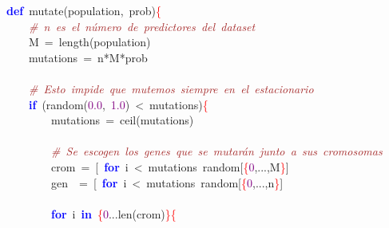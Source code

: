 \noindent
\mbox{}\textbf{\textcolor{Blue}{def}}\ mutate\textcolor{BrickRed}{(}population\textcolor{BrickRed}{,}\ prob\textcolor{BrickRed}{)}\textcolor{Red}{\{} \\
\mbox{}\ \ \ \ \textit{\textcolor{Brown}{\#\ n\ es\ el\ número\ de\ predictores\ del\ dataset}} \\
\mbox{}\ \ \ \ M\ \textcolor{BrickRed}{=}\ length\textcolor{BrickRed}{(}population\textcolor{BrickRed}{)} \\
\mbox{}\ \ \ \ mutations\ \textcolor{BrickRed}{=}\ n\textcolor{BrickRed}{*}M\textcolor{BrickRed}{*}prob \\
\mbox{} \\
\mbox{}\ \ \ \ \textit{\textcolor{Brown}{\#\ Esto\ impide\ que\ mutemos\ siempre\ en\ el\ estacionario}} \\
\mbox{}\ \ \ \ \textbf{\textcolor{Blue}{if}}\ \textcolor{BrickRed}{(}random\textcolor{BrickRed}{(}\textcolor{Purple}{0.0}\textcolor{BrickRed}{,}\ \textcolor{Purple}{1.0}\textcolor{BrickRed}{)}\ \textcolor{BrickRed}{\textless{}}\ mutations\textcolor{BrickRed}{)}\textcolor{Red}{\{} \\
\mbox{}\ \ \ \ \ \ \ \ mutations\ \textcolor{BrickRed}{=}\ ceil\textcolor{BrickRed}{(}mutations\textcolor{BrickRed}{)} \\
\mbox{} \\
\mbox{}\ \ \ \ \ \ \ \ \textit{\textcolor{Brown}{\#\ Se\ escogen\ los\ genes\ que\ se\ mutarán\ junto\ a\ sus\ cromosomas}} \\
\mbox{}\ \ \ \ \ \ \ \ crom\ \textcolor{BrickRed}{=}\ \textcolor{BrickRed}{[}\ \textbf{\textcolor{Blue}{for}}\ i\ \textcolor{BrickRed}{\textless{}}\ mutations\ random\textcolor{BrickRed}{[}\textcolor{Red}{\{}\textcolor{Purple}{0}\textcolor{BrickRed}{,...,}M\textcolor{Red}{\}}\textcolor{BrickRed}{]} \\
\mbox{}\ \ \ \ \ \ \ \ gen\ \ \textcolor{BrickRed}{=}\ \textcolor{BrickRed}{[}\ \textbf{\textcolor{Blue}{for}}\ i\ \textcolor{BrickRed}{\textless{}}\ mutations\ random\textcolor{BrickRed}{[}\textcolor{Red}{\{}\textcolor{Purple}{0}\textcolor{BrickRed}{,...,}n\textcolor{Red}{\}}\textcolor{BrickRed}{]} \\
\mbox{} \\
\mbox{}\ \ \ \ \ \ \ \ \textbf{\textcolor{Blue}{for}}\ i\ \textbf{\textcolor{Blue}{in}}\ \textcolor{Red}{\{}\textcolor{Purple}{0}\textcolor{BrickRed}{...}len\textcolor{BrickRed}{(}crom\textcolor{BrickRed}{)}\textcolor{Red}{\}\{} \\
